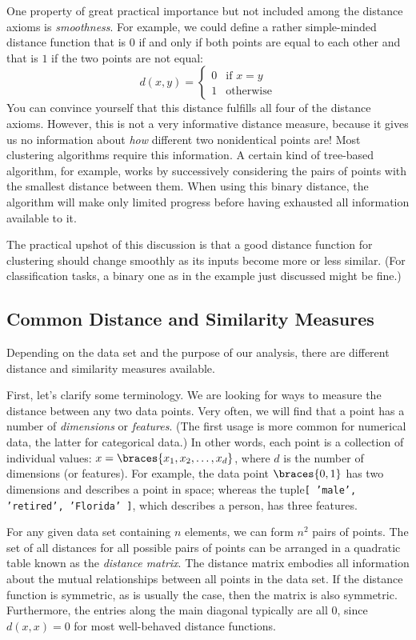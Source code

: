 One property of great practical importance but not included among the
distance axioms is \emph{smoothness}.  For example, we could define a
rather simple-minded distance function that is $0$ if and only if both
points are equal to each other and that is $1$ if the two points are
not equal:
%
\[
d(x,y) = 
\begin{cases}
  0 & \text{if $x=y$} \\
  1 & \text{otherwise}
\end{cases}
\]
%
You can convince yourself that this distance fulfills all four of the
distance axioms. However, this is not a very informative distance
measure, because it gives us no information about \emph{how} different
two nonidentical points are! Most clustering algorithms require this
information. A certain kind of tree-based algorithm, for example,
works by successively considering the pairs of points with the
smallest distance between them. When using this binary distance, the
algorithm will make only limited progress before having exhausted
all information available to it.

The practical upshot of this discussion is that a good distance
function for clustering should change smoothly as its inputs become
more or less similar. (For classification tasks, a binary one as in
the example just discussed might be fine.)

\subsection{Common Distance and Similarity Measures}

Depending on the data set and the purpose of our analysis, there are
different distance and similarity measures available.

First, let's clarify some terminology. We are looking for ways to
measure the distance between any two data points. Very often, we will
find that a point has a number of \emph{dimensions} or
\emph{features}. (The first usage is more common for numerical data,
the latter for categorical data.) In other words, each point is a
collection of individual values: $x = \braces{x_1, x_2, \dots, x_d}$,
where $d$ is the number of dimensions (or features).  For example, the
data point $\braces{0, 1}$ has two dimensions and describes a point in
space; whereas the tuple\break \texttt{[ 'male', 'retired', 'Florida' ]},
which describes a person, has three features.

For any given data set containing $n$ elements, we can form $n^2$
pairs of points. The set of all distances for all possible pairs of
points can be arranged in a quadratic table known as the
\emph{distance matrix}.  The distance matrix embodies all information
about the mutual relationships between all points in the data set. If
the distance function is symmetric, as is usually the case, then the
matrix is also symmetric. Furthermore, the entries along the main
diagonal typically are all $0$, since $d(x,x) = 0$ for most
well-behaved distance functions.

